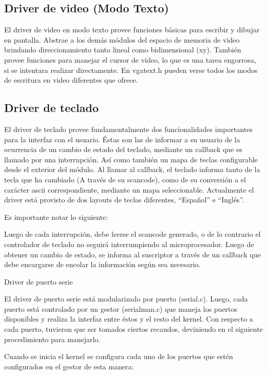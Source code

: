 \documentclass[11pt]{article}
\begin{document}
\subsection{Driver de video (Modo Texto)}

El driver de video en modo texto provee funciones básicas para escribir y dibujar en pantalla. Abstrae a los demás módulos del espacio de memoria de video brindando direccionamiento tanto lineal como bidimensional (xy). También provee funciones para manejar el cursor de video, lo que es una tarea engorrosa, si se intentara realizar directamente. En vgatext.h pueden verse todos los modos de escritura en video diferentes que ofrece.

\subsection{Driver de teclado}

El driver de teclado provee fundamentalmente dos funcionalidades importantes para la interfaz con el usuario. Éstas son las de informar a su usuario de la ocurrencia de un cambio de estado del teclado, mediante un callback que es llamado por una interrupción. Así como también un mapa de teclas configurable desde el exterior del módulo. 
Al llamar al callback, el teclado informa tanto de la tecla que ha cambiado (A través de su scancode), como de su conversión a el carácter ascii correspondiente, mediante un mapa seleccionable.
Actualmente el driver está provisto de dos layouts de teclas diferentes, “Español” e “Inglés”.

Es importante notar lo siguiente:

Luego de cada interrupción, debe leerse el scancode generado, o de lo contrario el controlador de teclado no seguirá interrumpiendo al microprocesador.
Luego de obtener un cambio de estado, se informa al suscriptor a través de un callback que debe encargarse de encolar la información según sea necesario. 

Driver de puerto serie

El driver de puerto serie está modularizado por puerto (serial.c). Luego, cada puerto está controlado por un gestor (serialman.c) que maneja los puertos disponibles y realiza la interfaz entre éstos y el resto del kernel.
Con respecto a cada puerto, tuvieron que ser tomados ciertos recaudos, deviniendo en el siguiente procedimiento para manejarlo.

Cuando se inicia el kernel se configura cada uno de los puertos que estén configurados en el gestor de esta manera:
\end{document}
